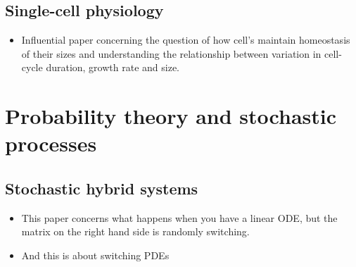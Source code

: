 \documentclass{amsart}
\begin{document}
\subsection{Single-cell physiology}
\begin{itemize}
\item \cite{amir2014} Influential paper concerning the question of how cell's maintain homeostasis of their sizes and understanding the relationship between variation in cell-cycle duration, growth rate and size. 
\end{itemize}

%


\section{Probability theory and stochastic processes}



\subsection{Stochastic hybrid systems}
\begin{itemize}
\item \cite{lawley2013} This paper concerns what happens when you have a linear ODE, but the matrix on the right hand side is randomly switching. 
\item \cite{lawley2016} And this is about switching PDEs
\end{itemize}
\end{document}
